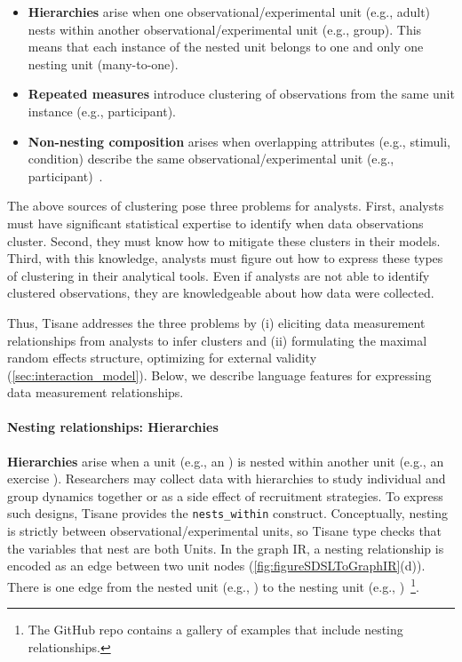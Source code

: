\begin{itemize}
  \item \textbf{Hierarchies} arise when one observational/experimental unit
  (e.g., adult) nests within another observational/experimental unit (e.g.,
  group). This means that each instance of the nested unit belongs to one and
  only one nesting unit (many-to-one).
  \item \textbf{Repeated measures} introduce clustering of observations from the
  same unit instance (e.g., participant).
  \item \textbf{Non-nesting composition} arises when overlapping attributes
  (e.g., stimuli, condition) describe the same observational/experimental unit
  (e.g., participant)~\cite{gelmanHill2006regression}.
\end{itemize}

The above sources of clustering pose three problems for analysts. First,
analysts must have significant statistical expertise to identify when data
observations cluster. Second, they must know how to mitigate these clusters in
their models. Third, with this knowledge, analysts must figure out how to
express these types of clustering in their analytical tools. Even if analysts
are not able to identify clustered observations, they are knowledgeable about
how data were collected.


Thus, Tisane addresses the three problems by (i) eliciting data measurement
relationships from analysts to infer clusters and (ii) formulating the maximal
random effects structure, optimizing for external validity
(\autoref{sec:interaction_model}). Below, we describe language features for expressing data measurement relationships.

\paragraph{Nesting relationships: Hierarchies}
\textbf{Hierarchies} arise when a unit (e.g., an \adult) is nested within another
unit (e.g., an exercise \group). Researchers may collect data with
hierarchies to study individual and group dynamics together or as a side effect of
recruitment strategies. To express such designs, Tisane provides the
\texttt{nests\_within} construct. Conceptually, nesting is strictly between
observational/experimental units, so Tisane type checks that the variables
that nest are both Units. %
In the graph IR, a nesting relationship is encoded as an edge between two unit
nodes (\autoref{fig:figureSDSLToGraphIR}(d)). There is one edge from the nested
unit (e.g., \adult) to the nesting unit (e.g., \group)~\footnote{The GitHub repo contains a gallery of examples that include nesting relationships.}.

